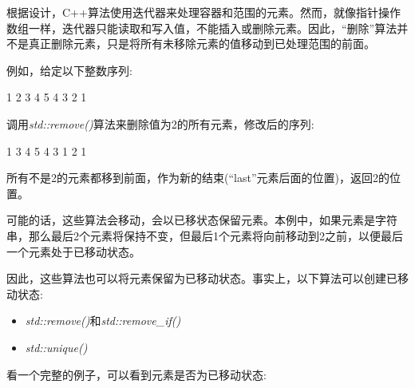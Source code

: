根据设计，C++算法使用迭代器来处理容器和范围的元素。然而，就像指针操作数组一样，迭代器只能读取和写入值，不能插入或删除元素。因此，“删除”算法并不是真正删除元素，只是将所有未移除元素的值移动到已处理范围的前面。\par

例如，给定以下整数序列:\par

\begin{tcolorbox}[colback=white,colframe=black]
1 2 3 4 5 4 3 2 1
\end{tcolorbox}	

调用\textit{std::remove()}算法来删除值为2的所有元素，修改后的序列:\par

\begin{tcolorbox}[colback=white,colframe=black]
1 3 4 5 4 3 1 2 1
\end{tcolorbox}	

所有不是2的元素都移到前面，作为新的结束(“last”元素后面的位置)，返回2的位置。\par

可能的话，这些算法会移动，会以已移状态保留元素。本例中，如果元素是字符串，那么最后2个元素将保持不变，但最后1个元素将向前移动到2之前，以便最后一个元素处于已移动状态。\par

因此，这些算法也可以将元素保留为已移动状态。事实上，以下算法可以创建已移动状态:\par

\begin{itemize}
	\item \textit{std::remove()}和\textit{std::remove\_if()}
	\item \textit{std::unique()}
\end{itemize}

看一个完整的例子，可以看到元素是否为已移动状态:\par

{\color{red}{lib/email.hpp}}\par

